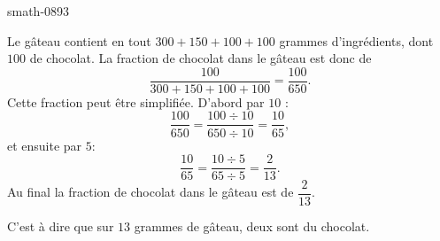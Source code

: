 
\begin{corrige}{smath-0893}

    Le gâteau contient en tout \( 300+150+100+100\) grammes d'ingrédients, dont \( 100\) de chocolat. La fraction de chocolat dans le gâteau est donc de
    \begin{equation}
        \frac{ 100 }{ 300+150+100+100 }=\frac{ 100 }{ 650 }.
    \end{equation}
    Cette fraction peut être simplifiée. D'abord par \( 10\) :
    \begin{equation}
        \frac{ 100 }{ 650 }=\frac{ 100\div 10 }{ 650\div 10 }=\frac{ 10 }{ 65 },
    \end{equation}
    et ensuite par \( 5\):
    \begin{equation}
        \frac{ 10 }{ 65 }=\frac{ 10\div 5 }{ 65\div 5 }=\frac{ 2 }{ 13 }.
    \end{equation}
    Au final la fraction de chocolat dans le gâteau est de \( \dfrac{ 2 }{ 13 }\).

    C'est à dire que sur \( 13\) grammes de gâteau, deux sont du chocolat.

\end{corrige}
